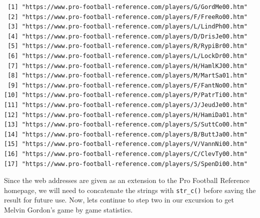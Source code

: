\documentclass[
]{article}
\newenvironment{Shaded}{\begin{snugshade}}{\end{snugshade}}
\newcommand{\DataTypeTok}[1]{\textcolor[rgb]{0.13,0.29,0.53}{#1}}
\newcommand{\KeywordTok}[1]{\textcolor[rgb]{0.13,0.29,0.53}{\textbf{#1}}}
\newcommand{\NormalTok}[1]{#1}
\newcommand{\OperatorTok}[1]{\textcolor[rgb]{0.81,0.36,0.00}{\textbf{#1}}}
\newcommand{\StringTok}[1]{\textcolor[rgb]{0.31,0.60,0.02}{#1}}
\begin{document}
\begin{Shaded}
\end{Shaded}

\begin{verbatim}
 [1] "https://www.pro-football-reference.com/players/G/GordMe00.htm"
 [2] "https://www.pro-football-reference.com/players/F/FreeRo00.htm"
 [3] "https://www.pro-football-reference.com/players/L/LindPh00.htm"
 [4] "https://www.pro-football-reference.com/players/D/DrisJe00.htm"
 [5] "https://www.pro-football-reference.com/players/R/RypiBr00.htm"
 [6] "https://www.pro-football-reference.com/players/L/LockDr00.htm"
 [7] "https://www.pro-football-reference.com/players/H/HamlKJ00.htm"
 [8] "https://www.pro-football-reference.com/players/M/MartSa01.htm"
 [9] "https://www.pro-football-reference.com/players/F/FantNo00.htm"
[10] "https://www.pro-football-reference.com/players/P/PatrTi00.htm"
[11] "https://www.pro-football-reference.com/players/J/JeudJe00.htm"
[12] "https://www.pro-football-reference.com/players/H/HamiDa01.htm"
[13] "https://www.pro-football-reference.com/players/S/SuttCo00.htm"
[14] "https://www.pro-football-reference.com/players/B/ButtJa00.htm"
[15] "https://www.pro-football-reference.com/players/V/VannNi00.htm"
[16] "https://www.pro-football-reference.com/players/C/ClevTy00.htm"
[17] "https://www.pro-football-reference.com/players/S/SpenDi00.htm"
\end{verbatim}

Since the web addresses are given as an extension to the Pro Football Reference homepage, we will need to concatenate the strings with \texttt{str\_c()} before saving the result for future use. Now, lets continue to step two in our excursion to get Melvin Gordon's game by game statistics.
\end{document}
